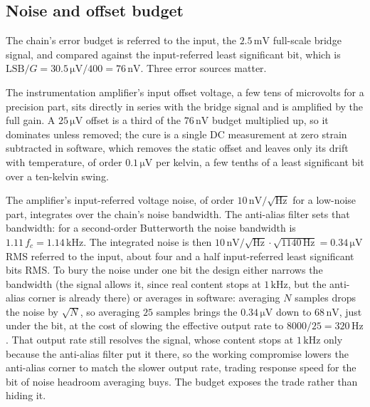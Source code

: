 



\subsection{Noise and offset budget}

The chain's error budget is referred to the input, the $2.5\,\si{\milli
\volt}$ full-scale bridge signal, and compared against the input-referred
least significant bit, which is $\text{LSB}/G = 30.5\,\si{\micro\volt}
/400 = 76\,\si{\nano\volt}$. Three error sources matter.

The instrumentation amplifier's input offset voltage, a few tens of
microvolts for a precision part, sits directly in series with the bridge
signal and is amplified by the full gain. A $25\,\si{\micro\volt}$ offset
is a third of the $76\,\si{\nano\volt}$ budget multiplied up, so it
dominates unless removed; the cure is a single DC measurement at zero
strain subtracted in software, which removes the static offset and leaves
only its drift with temperature, of order $0.1\,\si{\micro\volt}$ per
kelvin, a few tenths of a least significant bit over a ten-kelvin
swing.

The amplifier's input-referred voltage noise, of order $10\,\si{\nano
\volt}/\sqrt{\si{\hertz}}$ for a low-noise part, integrates over the
chain's noise bandwidth. The anti-alias filter sets that bandwidth: for a
second-order Butterworth the noise bandwidth is $1.11\,f_c =
1.14\,\si{\kilo\hertz}$. The integrated noise is then $10\,\si{\nano
\volt}/\sqrt{\si{\hertz}}\cdot\sqrt{1140\,\si{\hertz}} = 0.34\,\si{\micro
\volt}$ RMS referred to the input, about four and a half input-referred
least significant bits RMS. To bury the noise under one bit the design
either narrows the bandwidth (the signal allows it, since real content
stops at $1\,\si{\kilo\hertz}$, but the anti-alias corner is already
there) or averages in software: averaging $N$ samples drops the noise by
$\sqrt{N}$, so averaging $25$ samples brings the $0.34\,\si{\micro\volt}$
down to $68\,\si{\nano\volt}$, just under the bit, at the cost of slowing
the effective output rate to $8000/25 = 320\,\si{\hertz}$. That output
rate still resolves the signal, whose content stops at $1\,\si{\kilo
\hertz}$ only because the anti-alias filter put it there, so the working
compromise lowers the anti-alias corner to match the slower output rate,
trading response speed for the bit of noise headroom averaging buys. The
budget exposes the trade rather than hiding it.

